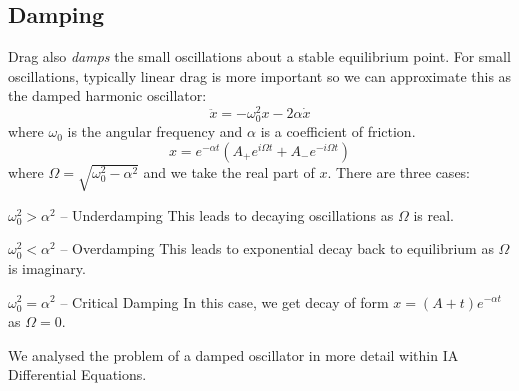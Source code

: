 \documentclass[../main.tex]{subfiles}
\begin{document}
\subsection{Damping}
Drag also \textit{damps} the small oscillations about a stable equilibrium point.
For small oscillations, typically linear drag is more important so we can approximate this as the damped harmonic oscillator:
\[
  \ddot{x} = -\omega^2_0 x - 2\alpha \dot{x}
\]
where $\omega_0$ is the angular frequency and $\alpha$ is a coefficient of friction.
\[
  x = e^{-\alpha t} (A_+ e^{i \Omega t} + A_- e^{-i\Omega t})
\]
where $\Omega = \sqrt{\omega^2_0 - \alpha^2}$ and we take the real part of $x$.
There are three cases:
\begin{proofcases}
  \begin{case}{$\omega^2_0 > \alpha^2$ -- Underdamping}
    This leads to decaying oscillations as $\Omega$ is real.
  \end{case}
  \begin{case}{$\omega^2_0 < \alpha^2$ -- Overdamping}
    This leads to exponential decay back to equilibrium as $\Omega$ is imaginary.
  \end{case}
  \begin{case}{$\omega^2_0 = \alpha^2$ -- Critical Damping}
    In this case, we get decay of form $x = (A + t)e^{-\alpha t}$ as $\Omega = 0$.
  \end{case}
\end{proofcases}
\begin{remark}
  We analysed the problem of a damped oscillator in more detail within IA Differential Equations.
\end{remark}
\end{document}
